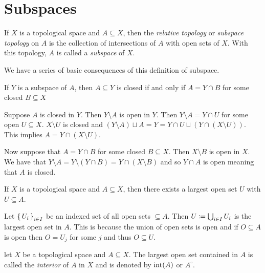 \documentclass[letterpaper, 11pt]{article}
\begin{document}
\clearpage

\section{Subspaces}

\begin{defn}[Subspace]
  If $X$ is a topological space and $A \subseteq X$, then the \emph{relative topology} or \emph{subspace topology} on $A$ is the collection of intersections of $A$ with open sets of $X$.
  With this topology, $A$ is called a \emph{subspace} of $X$.
\end{defn}

We have a series of basic consequences of this definition of subspace.

\begin{prop}
  If $Y$ is a subspace of $A$, then $A \subseteq Y$ is closed if and only if $A = Y \cap B$ for some closed $B \subseteq X$
\end{prop}
\begin{pf}
  Suppose $A$ is closed in $Y$.
  Then $Y \setminus A$ is open in $Y$.
  Then $Y \setminus A = Y \cap U$ for some open $U \subseteq X$.
  $X \setminus U$ is closed and $(Y \setminus A) \sqcup A = Y = Y \cap U \sqcup (Y \cap (X \setminus U))$.
  This implies $A = Y \cap (X \setminus U)$.

  Now suppose that $A = Y \cap B$ for some closed $B \subseteq X$.
  Then $X \setminus B$ is open in $X$.
  We have that $Y \setminus A = Y \setminus (Y \cap B) = Y \cap (X \setminus B)$ and so $Y \cap A$ is open meaning that $A$ is closed.
\end{pf}

\begin{prop}
  If $X$ is a topological space and $A \subseteq X$, then there exists a largest open set $U$ with $U \subseteq A$.
\end{prop}
\begin{pf}
  Let $\set{U_{i}}_{i \in I}$ be an indexed set of all open sets $\subseteq A$.
  Then $U \coloneqq \bigcup_{i \in I} U_{i}$ is the largest open set in $A$.
  This is because the union of open sets is open and if $O \subseteq A$ is open then $O = U_{j}$ for some $j$ and thus $O \subseteq U$.
\end{pf}
\begin{defn}[Interior]
  let $X$ be a topological space and $A \subseteq X$.
  The largest open set contained in $A$ is called the \emph{interior} of $A$ in $X$ and is denoted by $\operatorname{int}(A)$ or $A^{\circ}$.
\end{defn}
\end{document}
